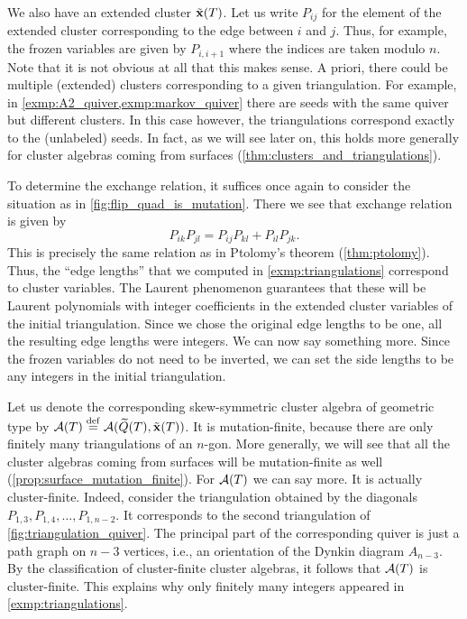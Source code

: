 \begin{example}
	We also have an extended cluster $\tilde{\mathbf{x}}(T)$. Let us write $P_{ij}$ for the element of
	the extended cluster corresponding to the edge between $i$ and $j$. Thus, for example,
	the frozen variables are given by $P_{i, i+1}$ where the indices are taken modulo $n$.
	Note that it is not obvious at all that this makes sense. A priori, there could be
	multiple (extended) clusters corresponding to a given triangulation. For example, in
	\cref{exmp:A2_quiver,exmp:markov_quiver} there are seeds with the same quiver but
	different clusters. In this case however, the triangulations correspond exactly to the
	(unlabeled) seeds. In fact, as we will see later on, this holds more generally for
	cluster algebras coming from surfaces (\cref{thm:clusters_and_triangulations}).

	To determine the exchange relation, it suffices once again to consider the situation as
	in \cref{fig:flip_quad_is_mutation}. There we see that exchange relation is given by
	\begin{equation}\label{eq:exchange_flip_quad}
		P_{ik}P_{jl} = P_{ij}P_{kl} + P_{il}P_{jk}.
	\end{equation}
	This is precisely the same relation as in Ptolomy's theorem (\cref{thm:ptolomy}). Thus,
	the ``edge lengths'' that we computed in \cref{exmp:triangulations} correspond to
	cluster variables. The Laurent phenomenon guarantees that these will be Laurent
	polynomials with integer coefficients in the extended cluster variables of the initial
	triangulation. Since we chose the original edge lengths to be one, all the resulting
	edge lengths were integers. We can now say something more. Since the frozen variables
	do not need to be inverted, we can set the side lengths to be any integers in the
	initial triangulation.

	Let us denote the corresponding skew-symmetric cluster algebra of geometric type by
	$\mathcal{A}(T) \overset{\mathrm{def}}{=} \mathcal{A}(\widetilde{Q}(T), \tilde{\mathbf{x}}(T))$. It is mutation-finite, because there are only
	finitely many triangulations of an $n$-gon. More generally, we will see that all the
	cluster algebras coming from surfaces will be mutation-finite as well
	(\cref{prop:surface_mutation_finite}). For $\mathcal{A}(T)$ we can say more. It is actually
	cluster-finite. Indeed, consider the triangulation obtained by the diagonals $P_{1, 3},
		P_{1,4}, \dots, P_{1,n-2}$. It corresponds to the second triangulation of
	\cref{fig:triangulation_quiver}. The principal part of the corresponding quiver is just
	a path graph on $n-3$ vertices, i.e., an orientation of the Dynkin diagram $A_{n-3}$.
	By the classification of cluster-finite cluster algebras, it follows that $\mathcal{A}(T)$ is
	cluster-finite. This explains why only finitely many integers appeared in
	\cref{exmp:triangulations}.


\end{example}
